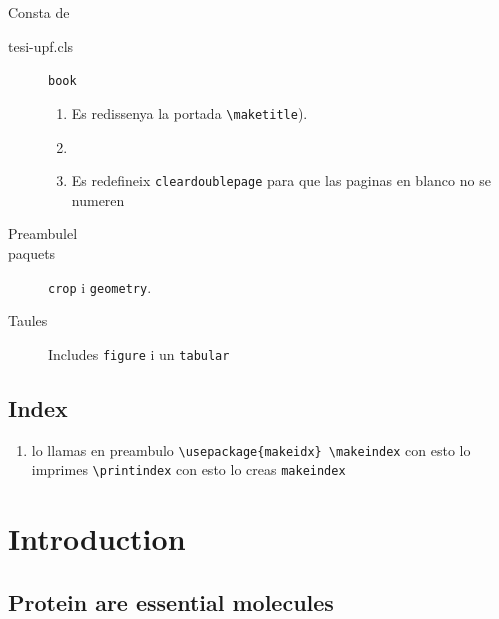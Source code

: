 \documentclass[12pt, a4paper,twoside]{tesi_upf}
\begin{document}
Consta de
\begin{description}
\item[tesi-upf.cls]{\tt book} 
  \begin{enumerate}
  \item Es redissenya la portada  \verb+\maketitle+).

  \item 

  \item Es redefineix {\tt cleardoublepage} para que las paginas en blanco no se numeren
  \end{enumerate}

\item[Preambulel] 
 

\item[paquets] {\tt crop} i {\tt geometry}. 




\item[Taules] Includes \verb+figure+ i un \verb+tabular+ 

\end{description}


\section*{Index}


\begin{enumerate}
\item lo llamas en preambulo  \verb+\usepackage{makeidx} \makeindex+ con esto lo imprimes \verb+\printindex+ con esto lo creas  \verb+makeindex+ 
\end{enumerate}



\chapter{Introduction} \label{introduction} 

\section{Protein are essential molecules}
\end{document}
